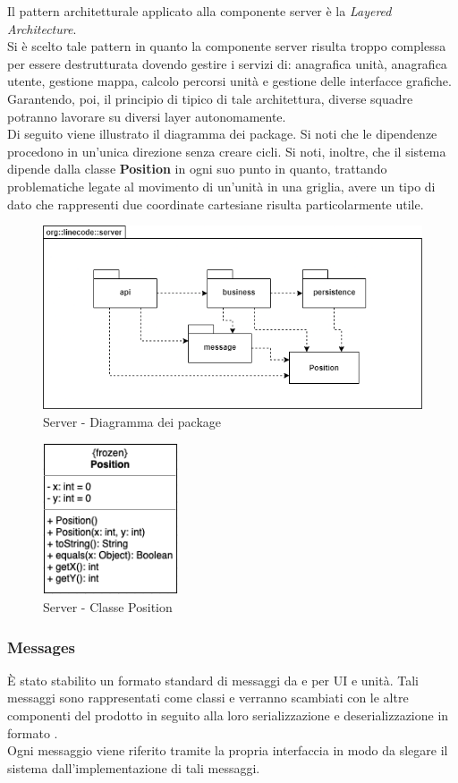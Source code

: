Il pattern architetturale applicato alla componente server è la \textit{Layered Architecture}. \\
Si è scelto tale pattern in quanto la componente server risulta troppo complessa per essere destrutturata dovendo gestire i servizi di: anagrafica unità, anagrafica utente, gestione mappa, calcolo percorsi unità e gestione delle interfacce grafiche. Garantendo, poi, il principio di  tipico di tale architettura, diverse squadre potranno lavorare su diversi layer autonomamente.\\
Di seguito viene illustrato il diagramma dei package. Si noti che le dipendenze procedono in un'unica direzione senza creare cicli. Si noti, inoltre, che il sistema dipende dalla classe \textbf{Position} in ogni suo punto in quanto, trattando problematiche legate al movimento di un'unità in una griglia, avere un tipo di dato che rappresenti due coordinate cartesiane risulta particolarmente utile.

\begin{figure}[H]
	\centering
	\includegraphics[width=12cm]{img/server_package.png}
	\caption{Server - Diagramma dei package}
\end{figure}

\begin{figure}[H]
    \centering
    \includegraphics[width=4cm]{img/class_position.png}
    \caption{Server - Classe Position}
\end{figure}

\subsubsection{Messages}
È stato stabilito un formato standard di messaggi da e per UI e unità. Tali messaggi sono rappresentati come classi  e verranno scambiati con le altre componenti del prodotto in seguito alla loro serializzazione e deserializzazione in formato .\\
Ogni messaggio viene riferito tramite la propria interfaccia in modo da slegare il sistema dall'implementazione di tali messaggi.

